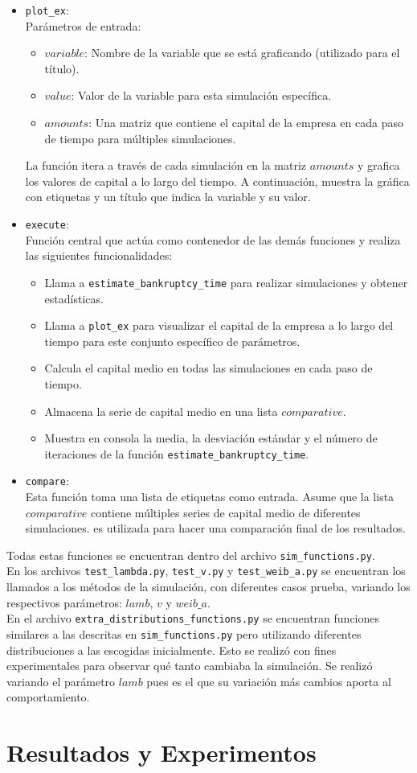 \documentclass{article}
\begin{document}
\begin{itemize}
    \item \texttt{plot\_ex}: \\ 
         Parámetros de entrada:
         \begin{itemize}
            \item $variable$: Nombre de la variable que se está graficando (utilizado para el título).
            \item $value$: Valor de la variable para esta simulación específica.
            \item $amounts$: Una matriz que contiene el capital de la empresa en cada paso de tiempo para múltiples simulaciones.
         \end{itemize}
         La función itera a través de cada simulación en la matriz $amounts$ y grafica los valores de capital a lo largo del tiempo. A continuación, muestra la gráfica con etiquetas y un título que indica la variable y su valor.

    \item \texttt{execute}: \\
           Función central que actúa como contenedor de las demás funciones y realiza las siguientes funcionalidades: 
           \begin{itemize}
            \item Llama a \texttt{estimate\_bankruptcy\_time} para realizar simulaciones y obtener estadísticas.
            \item Llama a \texttt{plot\_ex} para visualizar el capital de la empresa a lo largo del tiempo para este conjunto específico de parámetros.
            \item Calcula el capital medio en todas las simulaciones en cada paso de tiempo.
            \item Almacena la serie de capital medio en una lista $comparative$.
            \item Muestra en consola la media, la desviación estándar y el número de iteraciones de la función \texttt{estimate\_bankruptcy\_time}.
           \end{itemize}
    \item \texttt{compare}: \\
    Esta función toma una lista de etiquetas como entrada. Asume que la lista $comparative$ contiene múltiples series de capital medio de diferentes simulaciones. es utilizada para hacer una comparación final de los resultados. 
 \end{itemize}
 Todas estas funciones se encuentran dentro del archivo \texttt{sim\_functions.py}.\\
 En los archivos \texttt{test\_lambda.py}, \texttt{test\_v.py} y \texttt{test\_weib\_a.py} se encuentran los llamados a los métodos de la simulación, con diferentes casos prueba, variando los respectivos parámetros: $lamb$, $v$ y $weib\_a$.\\
 En el archivo \texttt{extra\_distributions\_functions.py} se encuentran funciones similares a las descritas en \texttt{sim\_functions.py} pero utilizando diferentes distribuciones a las escogidas inicialmente. Esto se realizó con fines experimentales para observar qué tanto cambiaba la simulación. Se realizó variando el parámetro $lamb$ pues es el que su variación más cambios aporta al comportamiento. 

 \section{Resultados y Experimentos}
 
\end{document}

